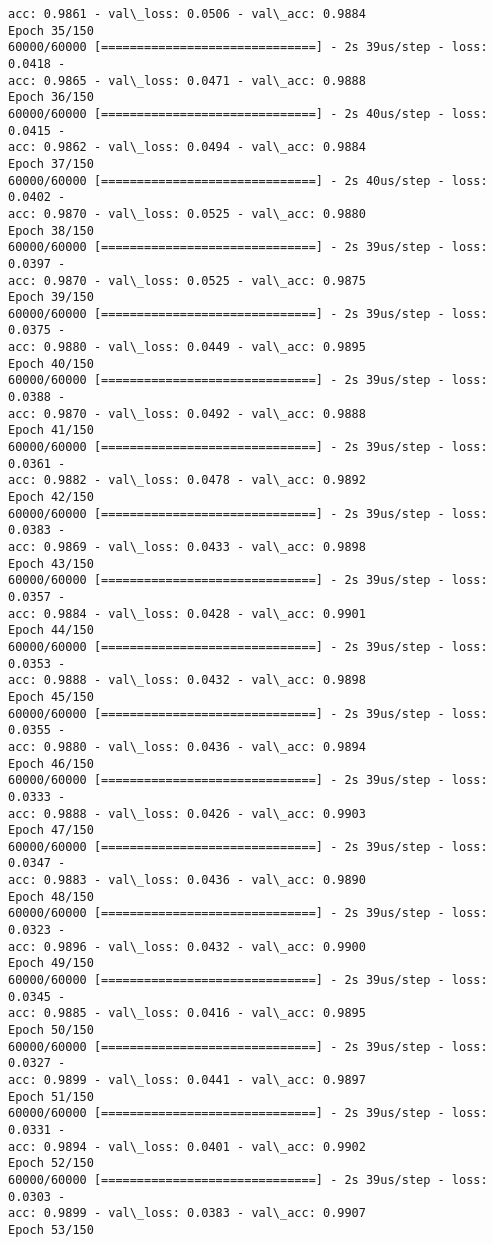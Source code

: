 \documentclass[11pt]{article}
\begin{document}
\begin{Verbatim}[commandchars=\\\{\}]
acc: 0.9861 - val\_loss: 0.0506 - val\_acc: 0.9884
Epoch 35/150
60000/60000 [==============================] - 2s 39us/step - loss: 0.0418 -
acc: 0.9865 - val\_loss: 0.0471 - val\_acc: 0.9888
Epoch 36/150
60000/60000 [==============================] - 2s 40us/step - loss: 0.0415 -
acc: 0.9862 - val\_loss: 0.0494 - val\_acc: 0.9884
Epoch 37/150
60000/60000 [==============================] - 2s 40us/step - loss: 0.0402 -
acc: 0.9870 - val\_loss: 0.0525 - val\_acc: 0.9880
Epoch 38/150
60000/60000 [==============================] - 2s 39us/step - loss: 0.0397 -
acc: 0.9870 - val\_loss: 0.0525 - val\_acc: 0.9875
Epoch 39/150
60000/60000 [==============================] - 2s 39us/step - loss: 0.0375 -
acc: 0.9880 - val\_loss: 0.0449 - val\_acc: 0.9895
Epoch 40/150
60000/60000 [==============================] - 2s 39us/step - loss: 0.0388 -
acc: 0.9870 - val\_loss: 0.0492 - val\_acc: 0.9888
Epoch 41/150
60000/60000 [==============================] - 2s 39us/step - loss: 0.0361 -
acc: 0.9882 - val\_loss: 0.0478 - val\_acc: 0.9892
Epoch 42/150
60000/60000 [==============================] - 2s 39us/step - loss: 0.0383 -
acc: 0.9869 - val\_loss: 0.0433 - val\_acc: 0.9898
Epoch 43/150
60000/60000 [==============================] - 2s 39us/step - loss: 0.0357 -
acc: 0.9884 - val\_loss: 0.0428 - val\_acc: 0.9901
Epoch 44/150
60000/60000 [==============================] - 2s 39us/step - loss: 0.0353 -
acc: 0.9888 - val\_loss: 0.0432 - val\_acc: 0.9898
Epoch 45/150
60000/60000 [==============================] - 2s 39us/step - loss: 0.0355 -
acc: 0.9880 - val\_loss: 0.0436 - val\_acc: 0.9894
Epoch 46/150
60000/60000 [==============================] - 2s 39us/step - loss: 0.0333 -
acc: 0.9888 - val\_loss: 0.0426 - val\_acc: 0.9903
Epoch 47/150
60000/60000 [==============================] - 2s 39us/step - loss: 0.0347 -
acc: 0.9883 - val\_loss: 0.0436 - val\_acc: 0.9890
Epoch 48/150
60000/60000 [==============================] - 2s 39us/step - loss: 0.0323 -
acc: 0.9896 - val\_loss: 0.0432 - val\_acc: 0.9900
Epoch 49/150
60000/60000 [==============================] - 2s 39us/step - loss: 0.0345 -
acc: 0.9885 - val\_loss: 0.0416 - val\_acc: 0.9895
Epoch 50/150
60000/60000 [==============================] - 2s 39us/step - loss: 0.0327 -
acc: 0.9899 - val\_loss: 0.0441 - val\_acc: 0.9897
Epoch 51/150
60000/60000 [==============================] - 2s 39us/step - loss: 0.0331 -
acc: 0.9894 - val\_loss: 0.0401 - val\_acc: 0.9902
Epoch 52/150
60000/60000 [==============================] - 2s 39us/step - loss: 0.0303 -
acc: 0.9899 - val\_loss: 0.0383 - val\_acc: 0.9907
Epoch 53/150

\end{Verbatim}
\end{document}
